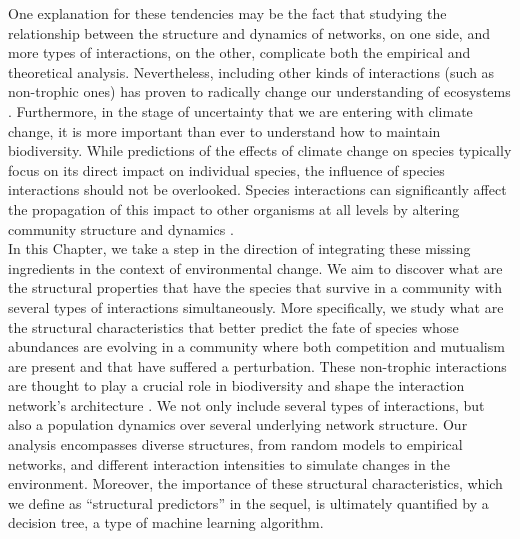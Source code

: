 One explanation for these tendencies may be the fact that studying the relationship between the structure and dynamics of networks, on one side, and more types of interactions, on the other, complicate both the empirical and theoretical analysis. Nevertheless, including other kinds of interactions (such as non-trophic ones) has proven to radically change our understanding  of ecosystems \cite{pocock2012robustness, Fontaine2011TheNetworks, Kefi2015NetworkShores, Garcia-Callejas2018ThePersistence,kefi2012more,bartomeus2021experimental}. Furthermore, in the stage of uncertainty that we are entering with climate change, it is more important than ever to understand how to maintain biodiversity. While predictions of the effects of climate change on species typically focus on its direct impact on individual species, the influence of species interactions should not be overlooked. Species interactions can significantly affect the propagation of this impact to other organisms at all levels by altering community structure and dynamics \cite{gilman2010framework}. \\

In this Chapter, we take a step in the direction of integrating these missing ingredients in the context of environmental change. We aim to discover what are the structural properties that have the species that survive in a community with several types of interactions simultaneously. More specifically, we study what are the structural characteristics that better predict the fate of species whose abundances are evolving in a community where both competition and mutualism are present and that have suffered a perturbation. These non-trophic interactions are thought to play a crucial role in biodiversity and shape the interaction network's architecture \cite{Wang2021InterspecificNetworks,Gracia-Lazaro2018TheEcosystems,bastolla2009mutualism,pocock2012robustness}. We not only include several types of interactions, but also a population dynamics over several underlying network structure. Our analysis encompasses  diverse structures, from  random models to empirical networks, and different interaction intensities to simulate changes in the environment. Moreover, the importance of these structural characteristics, which we define as ``structural predictors'' in the sequel, is ultimately quantified by a decision tree, a type of machine learning algorithm. \\

